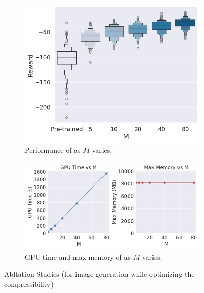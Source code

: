 \begin{figure}[!ht]
\begin{subfigure}[c]{0.40\textwidth}
    \includegraphics[width=\textwidth]{images/change_K_compress.png}
    \caption{Performance of {\alg} as $M$ varies. }
    \label{fig:change_k_compress}
\end{subfigure} 
    \begin{subfigure}[c]{0.6\textwidth}
    \includegraphics[width=\textwidth]{images/gpu_memory_time_plot_compress.png}
    \caption{GPU time and max memory of {\alg} as $M$ varies.}
    \label{fig:gpu_time_memory_compress}
\end{subfigure} 
\caption{Abltation Studies (for image generation while optimizing the compressibility) }
 \label{fig:additional_ablatation}
\end{figure}







